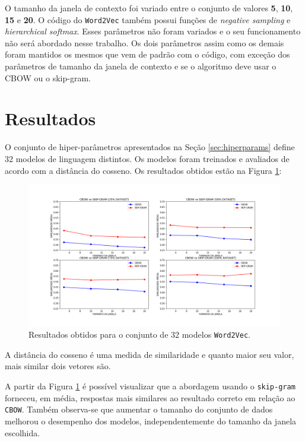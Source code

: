 \documentclass[11pt]{scrartcl} %
\begin{document}
O tamanho da janela de contexto foi variado entre o conjunto de valores \textbf{5}, \textbf{10}, \textbf{15} e \textbf{20}.
O código do \texttt{Word2Vec} também possui funções de \textit{negative sampling} e \textit{hierarchical softmax}. Esses parâmetros não foram variados e o seu funcionamento não será abordado nesse trabalho. Os dois parâmetros assim como os demais foram mantidos os mesmos que vem de padrão com o código, com exceção dos parâmetros de tamanho da janela de contexto e se o algoritmo deve usar o CBOW ou o skip-gram.


\section{Resultados}

O conjunto de hiper-parâmetros apresentados na Seção \ref{sec:hiperparams} define 32 modelos de linguagem distintos. Os modelos foram treinados e avaliados de acordo com a distância do cosseno.
Os resultados obtidos estão na Figura \ref{fig:results}:

\begin{figure}[H]\label{fig:results} %
	\centering
	\includegraphics[width=1\columnwidth]{./Figures/results.png} %
	\caption{Resultados obtidos para o conjunto de 32 modelos \texttt{Word2Vec}.}
\end{figure}
A distância do cosseno é uma medida de similaridade e quanto maior seu valor, mais similar dois vetores são.

A partir da Figura \ref{fig:results} é possível visualizar que a abordagem usando o \texttt{skip-gram} forneceu, em média, respostas mais similares ao resultado correto em relação ao \texttt{CBOW}. Também observa-se que aumentar o tamanho do conjunto de dados melhorou o desempenho dos modelos, independentemente do tamanho da janela escolhida.
\end{document}
